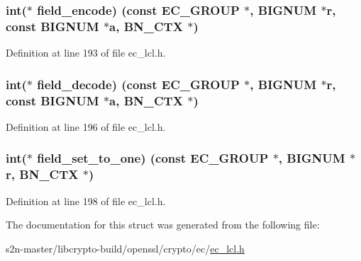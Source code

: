\subsubsection[{\texorpdfstring{field\+\_\+encode}{field_encode}}]{\setlength{\rightskip}{0pt plus 5cm}int($\ast$ field\+\_\+encode) (const {\bf E\+C\+\_\+\+G\+R\+O\+UP} $\ast$, {\bf B\+I\+G\+N\+UM} $\ast$r, const {\bf B\+I\+G\+N\+UM} $\ast${\bf a}, {\bf B\+N\+\_\+\+C\+TX} $\ast$)}\hypertarget{structec__method__st_ad2cde4a1fc1d3f8d2b1d73f3bc58a43f}{}\label{structec__method__st_ad2cde4a1fc1d3f8d2b1d73f3bc58a43f}


Definition at line 193 of file ec\+\_\+lcl.\+h.

\subsubsection[{\texorpdfstring{field\+\_\+decode}{field_decode}}]{\setlength{\rightskip}{0pt plus 5cm}int($\ast$ field\+\_\+decode) (const {\bf E\+C\+\_\+\+G\+R\+O\+UP} $\ast$, {\bf B\+I\+G\+N\+UM} $\ast$r, const {\bf B\+I\+G\+N\+UM} $\ast${\bf a}, {\bf B\+N\+\_\+\+C\+TX} $\ast$)}\hypertarget{structec__method__st_a9d01ba999cdc39d6950404e492456f8c}{}\label{structec__method__st_a9d01ba999cdc39d6950404e492456f8c}


Definition at line 196 of file ec\+\_\+lcl.\+h.

\subsubsection[{\texorpdfstring{field\+\_\+set\+\_\+to\+\_\+one}{field_set_to_one}}]{\setlength{\rightskip}{0pt plus 5cm}int($\ast$ field\+\_\+set\+\_\+to\+\_\+one) (const {\bf E\+C\+\_\+\+G\+R\+O\+UP} $\ast$, {\bf B\+I\+G\+N\+UM} $\ast$r, {\bf B\+N\+\_\+\+C\+TX} $\ast$)}\hypertarget{structec__method__st_a6ccc26cbb6e94d8da195e308092393e7}{}\label{structec__method__st_a6ccc26cbb6e94d8da195e308092393e7}


Definition at line 198 of file ec\+\_\+lcl.\+h.



The documentation for this struct was generated from the following file\+:\begin{DoxyCompactItemize}
\item 
s2n-\/master/libcrypto-\/build/openssl/crypto/ec/\hyperlink{ec__lcl_8h}{ec\+\_\+lcl.\+h}\end{DoxyCompactItemize}
